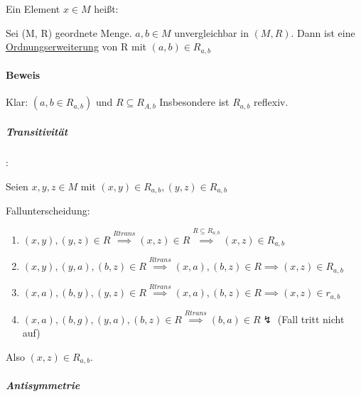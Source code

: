 \documentclass{../../meta/tudscript}
\begin{document}
    \setcounter{section}{14}
    \setcounter{subsection}{1}


    Ein Element $x \in M$ heißt:\\


    
        Sei (M, R) geordnete Menge. $a, b \in M$ unvergleichbar in $(M,R)$.
        Dann ist
        eine \underline{Ordnungserweiterung} von R mit $(a, b) \in R_{a, b}$

        \paragraph{Beweis}
	        Klar: $(a, b \in R_{a, b})$ und $R \subseteq R_{A, b}$
	        Insbesondere ist $R_{a, b}$ reflexiv.
        
	        \subparagraph{Transitivität}:
		            
		        Seien $x, y, z \in M$ mit $(x, y) \in R_{a, b}, (y, z) \in R_{a, b}$ 
		        
		        Fallunterscheidung:
		
		        \begin{enumerate}
		            \item $(x,y), (y, z) \in R \overset{R trans}{\implies} (x,z) \in R \overset{R \subseteq R_{a,b}}{\implies} (x, z) \in R_{a, b}$
		            \item $(x, y), (y, a), (b, z) \in R \overset{R trans}{\implies} (x, a), (b, z) \in R \implies (x, z) \in R_{a, b}$
		            \item $(x, a), (b, y), (y, z) \in R \overset{R trans}{\implies} (x,a), (b, z) \in R \implies (x,z) \in r_{a,b}$
		            \item $(x, a), (b,g),(y,a),(b,z) \in R \overset{R trans}{\implies} (b,a) \in R \lightning$ (Fall tritt nicht auf)
		        \end{enumerate}
		        
			Also $(x,z) \in R_{a, b}$.
		        
	        \subparagraph{Antisymmetrie}
		
\end{document}

